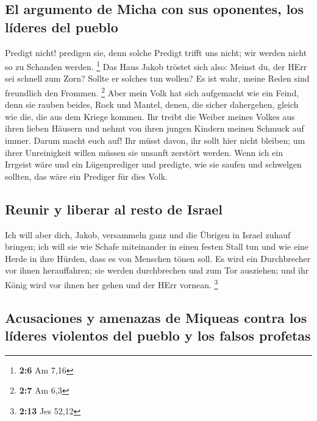 \hypertarget{el-argumento-de-micha-con-sus-oponentes-los-luxedderes-del-pueblo}{%
\subsection{El argumento de Micha con sus oponentes, los líderes del
pueblo}\label{el-argumento-de-micha-con-sus-oponentes-los-luxedderes-del-pueblo}}

 Predigt nicht! predigen sie, denn solche Predigt trifft
uns nicht; wir werden nicht so zu Schanden werden. \footnote{\textbf{2:6}
  Am 7,16}  Das Haus Jakob tröstet sich also: Meinst du,
der HErr sei schnell zum Zorn? Sollte er solches tun wollen? Es ist
wahr, meine Reden sind freundlich den Frommen. \footnote{\textbf{2:7} Am
  6,3}  Aber mein Volk hat sich aufgemacht wie ein Feind,
denn sie rauben beides, Rock und Mantel, denen, die sicher dahergehen,
gleich wie die, die aus dem Kriege kommen.  Ihr treibt die
Weiber meines Volkes aus ihren lieben Häusern und nehmt von ihren jungen
Kindern meinen Schmuck auf immer.  Darum macht euch auf!
Ihr müsst davon, ihr sollt hier nicht bleiben; um ihrer Unreinigkeit
willen müssen sie unsanft zerstört werden.  Wenn ich ein
Irrgeist wäre und ein Lügenprediger und predigte, wie sie saufen und
schwelgen sollten, das wäre ein Prediger für dies Volk.

\hypertarget{reunir-y-liberar-al-resto-de-israel}{%
\subsection{Reunir y liberar al resto de
Israel}\label{reunir-y-liberar-al-resto-de-israel}}

 Ich will aber dich, Jakob, versammeln ganz und die
Übrigen in Israel zuhauf bringen; ich will sie wie Schafe miteinander in
einen festen Stall tun und wie eine Herde in ihre Hürden, dass es von
Menschen tönen soll.  Es wird ein Durchbrecher vor ihnen
herauffahren; sie werden durchbrechen und zum Tor ausziehen; und ihr
König wird vor ihnen her gehen und der HErr vornean. \footnote{\textbf{2:13}
  Jes 52,12}

\hypertarget{acusaciones-y-amenazas-de-miqueas-contra-los-luxedderes-violentos-del-pueblo-y-los-falsos-profetas}{%
\subsection{Acusaciones y amenazas de Miqueas contra los líderes
violentos del pueblo y los falsos
profetas}\label{acusaciones-y-amenazas-de-miqueas-contra-los-luxedderes-violentos-del-pueblo-y-los-falsos-profetas}}

